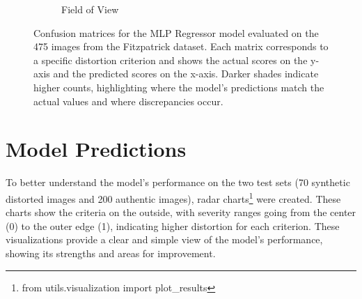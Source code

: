 \begin{figure}[ht]
\begin{subfigure}[b]{0.24\textwidth}
        \caption{Field of View}
        \label{fig:cm_fov}
    \end{subfigure}
    \caption{Confusion matrices for the MLP Regressor model evaluated on the 475 images from the Fitzpatrick dataset. Each matrix corresponds to a specific distortion criterion and shows the actual scores on the y-axis and the predicted scores on the x-axis. Darker shades indicate higher counts, highlighting where the model's predictions match the actual values and where discrepancies occur.}
    \label{fig:confusion_matrices}
\end{figure}
\vspace{\baselineskip}
\noindent

\clearpage
\section{Model Predictions}
\label{sec:VisualizingPredictions}
To better understand the model’s performance on the two test sets (70 synthetic distorted images and 200 authentic images), radar charts\footnote{from utils.visualization import plot\_results} were created. These charts show the criteria on the outside, with severity ranges going from the center (0) to the outer edge (1), indicating higher distortion for each criterion. These visualizations provide a clear and simple view of the model’s performance, showing its strengths and areas for improvement. \par
